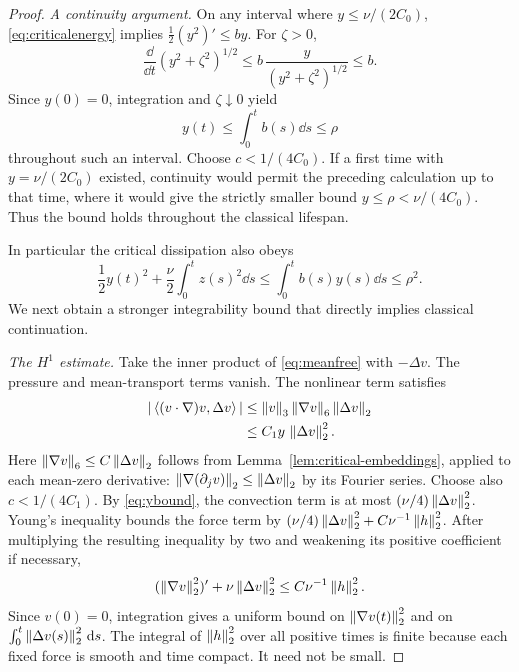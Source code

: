 \begin{proof}
\emph{A continuity argument.}
On any interval where $y\le\nu/(2C_0)$, \eqref{eq:criticalenergy} implies
$\tfrac12(y^2)'\le by$. For $\zeta>0$,
\[
 \frac{\dd}{\dd t}(y^2+\zeta^2)^{1/2}
 \le b\,\frac{y}{(y^2+\zeta^2)^{1/2}}\le b.
\]
Since $y(0)=0$, integration and $\zeta\downarrow0$ yield
\begin{equation}\label{eq:ybound}
 y(t)\le\int_0^t b(s)\dd s\le\rho
\end{equation}
throughout such an interval. Choose $c<1/(4C_0)$.
If a first time with $y=\nu/(2C_0)$ existed, continuity would permit the preceding calculation up to that time, where it would give the strictly smaller bound $y\le\rho<\nu/(4C_0)$. Thus the bound holds throughout the classical lifespan.

In particular the critical dissipation also obeys
\[
 \frac12y(t)^2+\frac{\nu}{2}\int_0^t z(s)^2\dd s
 \le\int_0^t b(s)y(s)\dd s\le\rho^2.
\]
We next obtain a stronger integrability bound that directly implies classical continuation.

\emph{The $H^1$ estimate.}
Take the inner product of \eqref{eq:meanfree} with $-\Delta v$.
The pressure and mean-transport terms vanish. The nonlinear term satisfies
\begin{align*}
 |\left\langle(v\cdot\nabla)v,\Delta v\right\rangle|
 &\le\left\lVert v\right\rVert_3\left\lVert\nabla v\right\rVert_6\left\lVert\Delta v\right\rVert_2\\
 &\le C_1y\,\left\lVert\Delta v\right\rVert_2^2.
\end{align*}
Here $\left\lVert\nabla v\right\rVert_6\le C\left\lVert\Delta v\right\rVert_2$ follows from
Lemma~\ref{lem:critical-embeddings}, applied to each mean-zero derivative:
$\left\lVert\nabla(\partial_jv)\right\rVert_2\le\left\lVert\Delta v\right\rVert_2$ by its Fourier series. Choose also $c<1/(4C_1)$.
By \eqref{eq:ybound}, the convection term is at most
$(\nu/4)\left\lVert\Delta v\right\rVert_2^2$. Young's inequality bounds the force term by
$(\nu/4)\left\lVert\Delta v\right\rVert_2^2+C\nu^{-1}\left\lVert h\right\rVert_2^2$.
After multiplying the resulting inequality by two and weakening its positive coefficient if necessary,
\begin{equation}\label{eq:H1energy}
 (\left\lVert\nabla v\right\rVert_2^2)'
 +\nu\left\lVert\Delta v\right\rVert_2^2\le C\nu^{-1}\left\lVert h\right\rVert_2^2.
\end{equation}
Since $v(0)=0$, integration gives a uniform bound on
$\left\lVert\nabla v(t)\right\rVert_2^2$ and on $\int_0^t\left\lVert\Delta v(s)\right\rVert_2^2\,\mathrm d s$.
The integral of $\left\lVert h\right\rVert_2^2$ over all positive times is finite because each fixed force is smooth and time compact. It need not be small.


\end{proof}
